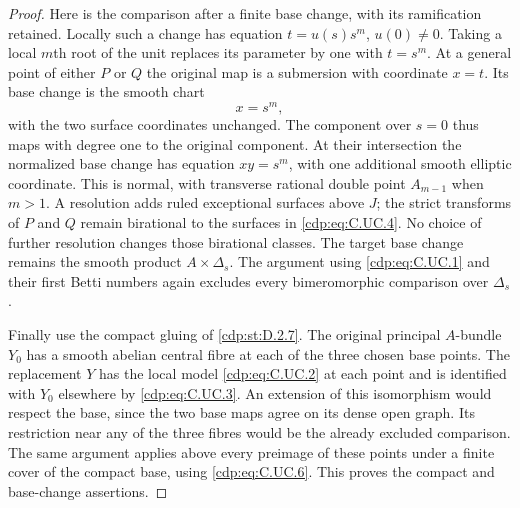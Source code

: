 \begin{proof}
Here is the comparison after a finite base
change, with its ramification retained.
Locally such a change has equation
$t=u(s)s^m$, $u(0)\ne0$. Taking a local
$m$th root of the unit replaces its
parameter by one with $t=s^m$.
At a general point of either $P$ or $Q$
the original map is a submersion with
coordinate $x=t$. Its base change is the
smooth chart
\[
                          x=s^m,
\tag{C.UC.6}\label{cdp:eq:C.UC.6}
\]
with the two surface coordinates unchanged.
The component over $s=0$ thus maps with
degree one to the original component.
At their intersection the normalized base
change has equation $xy=s^m$, with one
additional smooth elliptic coordinate.
This is normal, with transverse rational
double point $A_{m-1}$ when $m>1$.
A resolution adds ruled exceptional
surfaces above $J$; the strict transforms
of $P$ and $Q$ remain birational to the
surfaces in \eqref{cdp:eq:C.UC.4}. No choice of further
resolution changes those birational
classes. The target base change remains
the smooth product $A\times\Delta_s$.
The argument using \eqref{cdp:eq:C.UC.1} and their
first Betti numbers again excludes every
bimeromorphic comparison over $\Delta_s$.

Finally use the compact gluing of \ref{cdp:st:D.2.7}.
The original principal $A$-bundle $Y_0$
has a smooth abelian central fibre at
each of the three chosen base points.
The replacement $Y$ has the local model
\eqref{cdp:eq:C.UC.2} at each point and is identified
with $Y_0$ elsewhere by \eqref{cdp:eq:C.UC.3}.
An extension of this isomorphism would
respect the base, since the two base
maps agree on its dense open graph.
Its restriction near any of the three
fibres would be the already excluded
comparison. The same argument applies
above every preimage of these points
under a finite cover of the compact base,
using \eqref{cdp:eq:C.UC.6}. This proves the compact
and base-change assertions.


\end{proof}
